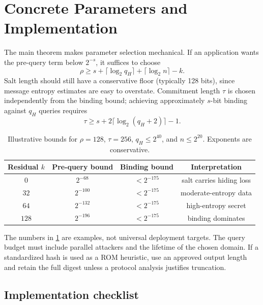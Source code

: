 \section{Concrete Parameters and Implementation}
\label{sec:parameters}

The main theorem makes parameter selection mechanical.  If an application
wants the pre-query term below $2^{-s}$, it suffices to choose
\begin{equation}
  \rho \geq s+\lceil\log_2 q_H\rceil+\lceil\log_2 n\rceil-k.
  \label{eq:rho-choice}
\end{equation}
Salt length should still have a conservative floor (typically 128 bits), since
message entropy estimates are easy to overstate.  Commitment length $\tau$
is chosen independently from the binding bound; achieving approximately
$s$-bit binding against $q_H$ queries requires
\begin{equation}
  \tau\geq s+2\lceil\log_2(q_H+2)\rceil-1.
  \label{eq:tau-choice}
\end{equation}

\begin{table}[t]
\caption{Illustrative bounds for $\rho=128$, $\tau=256$, $q_H\leq2^{40}$,
and $n\leq2^{20}$.  Exponents are conservative.}
\label{tab:parameters}
\centering
\small
\begin{tabular}{@{}cccc@{}}
\toprule
Residual $k$ & Pre-query bound & Binding bound & Interpretation \\
\midrule
$0$   & $2^{-68}$  & $<2^{-175}$ & salt carries hiding loss \\
$32$  & $2^{-100}$ & $<2^{-175}$ & moderate-entropy data \\
$64$  & $2^{-132}$ & $<2^{-175}$ & high-entropy secret \\
$128$ & $2^{-196}$ & $<2^{-175}$ & binding dominates \\
\bottomrule
\end{tabular}
\end{table}

The numbers in \cref{tab:parameters} are examples, not universal deployment
targets.  The query budget must include parallel attackers and the lifetime of
the chosen domain.  If a standardized hash is used as a ROM heuristic, use an
approved output length and retain the full digest unless a protocol analysis
justifies truncation.

\subsection{Implementation checklist}

